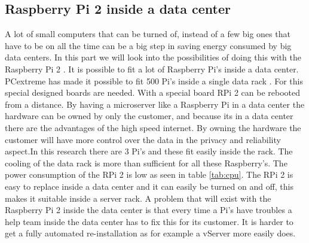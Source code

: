 \documentclass{sig-alternate-br}
\begin{document}
\subsection{Raspberry Pi 2 inside a data center}

A lot of small computers that can be turned of, instead of a few big ones that have to be on all the time can be a big step in saving energy consumed by big data centers. In this part we will look into the possibilities of doing this with the Raspberry Pi 2 . \newline
It is possible to fit a lot of Raspberry Pi's inside a data center. PCextreme has made it possible to fit 500 Pi's inside a single data rack \cite{Pcextreme}. For this special designed boards are needed. With a special board RPi 2 can be rebooted from a distance. By having a microserver like a Raspberry Pi in a data center the hardware can be owned by only the customer, and because its in a data center there are the advantages of the high speed internet. By owning the hardware the customer will have more control over the data in the privacy and reliability aspect.\newline In this research there are 3 Pi's and these fit easily inside the rack. The cooling of the data rack is more than sufficient for all these Raspberry's. The power consumption of the RPi 2 is low as seen in table \ref{tab:cpu}. The RPi 2 is easy to replace inside a data center and it can easily be turned on and off, this makes it suitable inside a server rack. A problem that will exist with the Raspberry Pi 2 inside the data center is that every time a Pi's have troubles a help team inside the data center has to fix this for its customer. It is harder to get  a fully automated re-installation as for example a vServer more easily does. 
\end{document}
